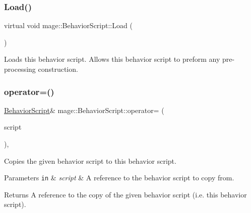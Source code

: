 \subsubsection{\texorpdfstring{Load()}{Load()}}
{\footnotesize\ttfamily virtual void mage\+::\+Behavior\+Script\+::\+Load (\begin{DoxyParamCaption}{ }\end{DoxyParamCaption})\hspace{0.3cm}{\ttfamily [virtual]}}

Loads this behavior script. Allows this behavior script to preform any pre-\/processing construction. \hypertarget{classmage_1_1_behavior_script_a0b3327ebf7009e668a7022d254cb1d51}{}\label{classmage_1_1_behavior_script_a0b3327ebf7009e668a7022d254cb1d51} 
\subsubsection{\texorpdfstring{operator=()}{operator=()}\hspace{0.1cm}{\footnotesize\ttfamily [1/2]}}
{\footnotesize\ttfamily \hyperlink{classmage_1_1_behavior_script}{Behavior\+Script}\& mage\+::\+Behavior\+Script\+::operator= (\begin{DoxyParamCaption}\item[{const \hyperlink{classmage_1_1_behavior_script}{Behavior\+Script} \&}]{script }\end{DoxyParamCaption})\hspace{0.3cm}{\ttfamily [private]}, {\ttfamily [delete]}}

Copies the given behavior script to this behavior script.


\begin{DoxyParams}[1]{Parameters}
\mbox{\tt in}  & {\em script} & A reference to the behavior script to copy from. \\
\hline
\end{DoxyParams}
\begin{DoxyReturn}{Returns}
A reference to the copy of the given behavior script (i.\+e. this behavior script). 
\end{DoxyReturn}
\hypertarget{classmage_1_1_behavior_script_a528c2bd218f2e6bb7d0a8ee50a05bf01}{}\label{classmage_1_1_behavior_script_a528c2bd218f2e6bb7d0a8ee50a05bf01} 
